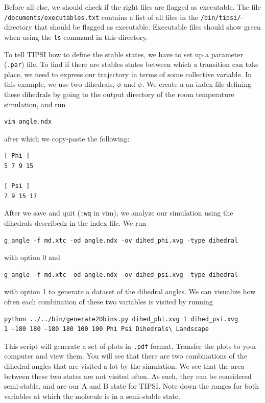 \documentclass[]{article}
\begin{document}
Before all else, we should check if the right files are flagged as executable. The file \texttt{/documents/executables.txt} contains a list of all files in the \texttt{/bin/tipsi/}-directory that should be flagged as executable. Executable files should show green when using the \texttt{ls} command in this directory.

To tell \textsc{TIPSI} how to define the stable states, we have to set up a parameter (\texttt{.par}) file. To find if there are stables states between which a transition can take place, we need to express our trajectory in terms of some collective variable. In this example, we use two dihedrals, $\phi$ and $\psi$. We create a an index file defining these dihedrals by going to the output directory of the room temperature simulation, and run
%
\begin{lstlisting}
vim angle.ndx
\end{lstlisting}
%
after which we copy-paste the following:
%
\begin{lstlisting}
[ Phi ]
5 7 9 15

[ Psi ]
7 9 15 17
\end{lstlisting}
%
After we save and quit (\texttt{:wq} in vim), we analyze our simulation using the dihedrals describedz in the index file. We run
%
\begin{lstlisting}
g_angle -f md.xtc -od angle.ndx -ov dihed_phi.xvg -type dihedral
\end{lstlisting}
%
with option 0 and 
%
\begin{lstlisting}
g_angle -f md.xtc -od angle.ndx -ov dihed_psi.xvg -type dihedral
\end{lstlisting}
%
with option 1 to generate a dataset of the dihedral angles. We can visualize how often each combination of these two variables is visited by running
%
\begin{lstlisting}
python ../../bin/generate2Dbins.py dihed_phi.xvg 1 dihed_psi.xvg 
1 -180 180 -180 180 100 100 Phi Psi Dihedrals\ Landscape
\end{lstlisting}
%
This script will generate a set of plots in \texttt{.pdf} format. Transfer the plots to your computer and view them. You will see that there are two combinations of the dihedral angles that are visited a lot by the simulation. We see that the area between these two states are not visited often. As such, they can be considered semi-stable, and are our A and B state for \textsc{TIPSI}. Note down the ranges for both variables at which the molecule is in a semi-stable state.
\end{document}
